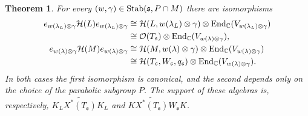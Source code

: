 \documentclass[11pt]{amsart}
\newtheorem{thm}{Theorem}[section]
\theoremstyle{definition}
\begin{document}
\begin{thm}\label{thm:3.7}
For every $(w,\gamma) \in {{\rm Stab}} ({{\mathfrak s}},P \cap M)$ there are isomorphisms
\begin{align*}
e_{w(\lambda_L ) \otimes \gamma} {{\mathcal H}} (L) e_{w(\lambda_L) \otimes \gamma} & \cong 
{{\mathcal H}} (L,w(\lambda_L) \otimes \gamma) \otimes {{\rm End}}_{\mathbb C} (V_{w(\lambda_L) \otimes \gamma}) \\
& \cong \mathcal O (T_{{\mathfrak s}}) \otimes {{\rm End}}_{\mathbb C} (V_{w(\lambda) \otimes \gamma}) ,\\
e_{w(\lambda) \otimes \gamma} {{\mathcal H}} (M) e_{w(\lambda) \otimes \gamma} & \cong 
{{\mathcal H}} (M,w(\lambda) \otimes \gamma) \otimes {{\rm End}}_{\mathbb C} (V_{w(\lambda) \otimes \gamma}) \\
& \cong {{\mathcal H}} (T_{{\mathfrak s}} , W_{{\mathfrak s}}, q_{{\mathfrak s}}) \otimes {{\rm End}}_{\mathbb C} (V_{w(\lambda) \otimes \gamma}) .
\end{align*}
In both cases the first isomorphism is canonical, and the second depends only on the 
choice of the parabolic subgroup $P$. The support of these algebras is, respectively, 
$K_L \widetilde{X^* (T_{{\mathfrak s}})} K_L$ and $K \widetilde{X^* (T_{{\mathfrak s}})} W_{{\mathfrak s}} K$.
\end{thm}
\end{document}
